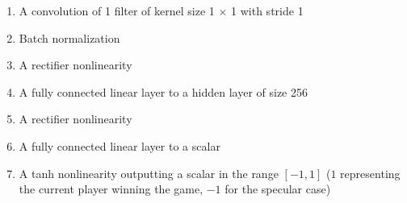 \documentclass{article}
\begin{document}
\begin{enumerate}
\begin{itemize}
		\begin{enumerate}
			\item A convolution of 1 filter of kernel size 1 $\times$ 1 with stride 1
			\item Batch normalization
			\item A rectifier nonlinearity
			\item A fully connected linear layer to a hidden layer of size 256
			\item A rectifier nonlinearity
			\item A fully connected linear layer to a scalar
			\item A tanh nonlinearity outputting a scalar in the range $[-1, 1]$ ($1$ representing the current player winning the game, $-1$ for the specular case)
		\end{enumerate}
	\end{itemize}
	
\end{enumerate}
\end{document}
